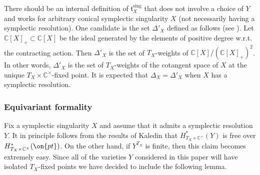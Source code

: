 \documentclass[12pt]{amsart}
\begin{document}
\begin{rmk}
There should be an internal definition of $\mathfrak{t}_{X}^{\mathrm{sing}}$ that does not involve a choice of $Y$ and works for arbitrary conical symplectic singularity $X$ (not necessarily having a symplectic resolution). One candidate is the set $\Delta'_X$ defined as follows (see \cite[Section 3.1]{kmp}). Let $\mathbb{C}[X]_+ \subset \mathbb{C}[X]$ be the ideal generated by the elements of positive degree w.r.t. the contracting action. Then $\Delta'_X$ is the set of $T_X$-weights of $\mathbb{C}[X]/(\mathbb{C}[X]_+)^2$. In other words, $\Delta'_X$ is the set of $T_X$-weights of the cotangent space of $X$ at the unique $T_X \times \mathbb{C}^\times$-fixed point.  It is expected that $\Delta_X=\Delta'_X$ when $X$ has a symplectic resolution. %
\end{rmk}


\subsubsection{Equivariant formality}
Fix a symplectic singularity $X$ and assume that it admits a symplectic resolution $Y$. It in principle follows from the results of Kaledin that $H^*_{T_X \times \mathbb{C}^\times}(Y)$ is free over $H^*_{T_X \times \mathbb{C}^\times}(\on{pt})$. On the other hand, if $Y^{T_X}$ is finite, then this claim becomes extremely easy. Since all of the varieties $Y$ considered in this paper will have isolated $T_X$-fixed points we have decided to include the following lemma.
\end{document}
